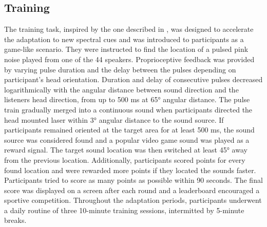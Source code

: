 \subsection{Training}
The training task, inspired by the one described in \citet{trapeau_fast_2016}, was designed to accelerate the adaptation to new spectral cues and was introduced to participants as a game-like scenario. They were instructed to find the location of a pulsed pink noise played from one of the 44 speakers. Proprioceptive feedback was provided by varying pulse duration and the delay between the pulses depending on participant’s head orientation. Duration and delay of consecutive pulses decreased logarithmically with the angular distance between sound direction and the listeners head direction, from up to 500 ms at 65° angular distance. The pulse train gradually merged into a continuous sound when participants directed the head mounted laser within 3° angular distance to the sound source. If participants remained oriented at the target area for at least 500 ms, the sound source was considered found and a popular video game sound was played as a reward signal. The target sound location was then switched at least 45° away from the previous location. Additionally, participants scored points for every found location and were rewarded more points if they located the sounds faster. Participants tried to score as many points as possible within 90 seconds. The final score was displayed on a screen after each round and a leaderboard encouraged a sportive competition. Throughout the adaptation periods, participants underwent a daily routine of three 10-minute training sessions, intermitted by 5-minute breaks.



